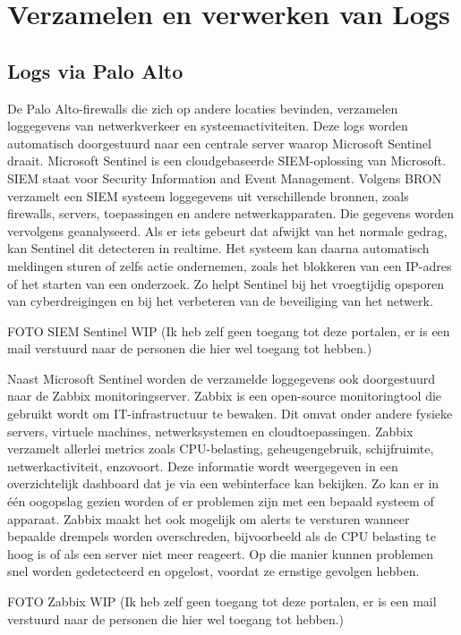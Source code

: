 \section{Verzamelen en verwerken van Logs}

\subsection{Logs via Palo Alto}
De Palo Alto-firewalls die zich op andere locaties bevinden, verzamelen loggegevens van netwerkverkeer en systeemactiviteiten. Deze logs worden automatisch doorgestuurd naar een centrale server waarop Microsoft Sentinel draait. Microsoft Sentinel is een cloudgebaseerde SIEM-oplossing van Microsoft. SIEM staat voor Security Information and Event Management.
Volgens BRON verzamelt een SIEM systeem loggegevens uit verschillende bronnen, zoals firewalls, servers, toepassingen en andere netwerkapparaten. Die gegevens worden vervolgens geanalyseerd. Als er iets gebeurt dat afwijkt van het normale gedrag, kan Sentinel dit detecteren in realtime. Het systeem kan daarna automatisch meldingen sturen of zelfs actie ondernemen, zoals het blokkeren van een IP-adres of het starten van een onderzoek. Zo helpt Sentinel bij het vroegtijdig opsporen van cyberdreigingen en bij het verbeteren van de beveiliging van het netwerk.

FOTO SIEM Sentinel WIP (Ik heb zelf geen toegang tot deze portalen, er is een mail verstuurd naar de personen die hier wel toegang tot hebben.)


Naast Microsoft Sentinel worden de verzamelde loggegevens ook doorgestuurd naar de Zabbix monitoringserver. Zabbix is een open-source monitoringtool die gebruikt wordt om IT-infrastructuur te bewaken. Dit omvat onder andere fysieke servers, virtuele machines, netwerksystemen en cloudtoepassingen.
Zabbix verzamelt allerlei metrics zoals CPU-belasting, geheugengebruik, schijfruimte, netwerkactiviteit, enzovoort. Deze informatie wordt weergegeven in een overzichtelijk dashboard dat je via een webinterface kan bekijken. Zo kan er in één oogopslag gezien worden of er problemen zijn met een bepaald systeem of apparaat.
Zabbix maakt het ook mogelijk om alerts te versturen wanneer bepaalde drempels worden overschreden, bijvoorbeeld als de CPU belasting te hoog is of als een server niet meer reageert. Op die manier kunnen problemen snel worden gedetecteerd en opgelost, voordat ze ernstige gevolgen hebben.

FOTO Zabbix WIP (Ik heb zelf geen toegang tot deze portalen, er is een mail verstuurd naar de personen die hier wel toegang tot hebben.)


